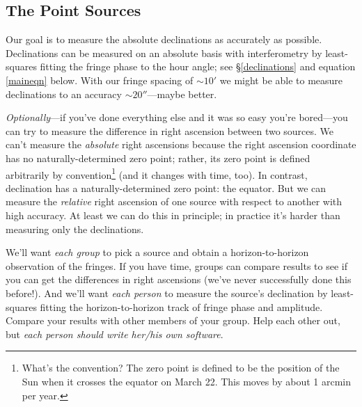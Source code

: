 \documentclass[11pt,preprint]{aastex}
\begin{document}
\subsection{The Point Sources}

	Our goal is to measure the absolute declinations as accurately
as possible.  Declinations can be measured on an absolute basis with
interferometry by least-squares fitting the fringe phase to the hour
angle; see \S\ref{declinations} and equation \ref{maineqn} below.  With our
fringe spacing of $\sim 10'$ we might be able to measure declinations to
an accuracy $\sim 20''$---maybe better.

{\it Optionally}---if you've done everything else and it was so easy
you're bored---you can try to measure the difference in right ascension
between two sources.  We can't measure the {\it absolute} right
ascensions because the right ascension coordinate has no
naturally-determined zero point; rather, its zero point is defined
arbitrarily by convention\footnote{What's the convention? The zero point
is defined to be the position of the Sun when it crosses the equator on
March 22. This moves by about 1 arcmin per year.} (and it changes with
time, too).  In contrast, declination has a naturally-determined zero
point: the equator.  But we can measure the {\it relative} right
ascension of one source with respect to another with high accuracy.  At
least we can do this in principle; in practice it's harder than
measuring only the declinations.

	We'll want {\it each group} to pick a source and obtain a
horizon-to-horizon observation of the fringes. If you have time, groups
can compare results to see if you can get the differences in right
ascensions (we've never successfully done this before!). And we'll want
{\it each person} to measure the source's declination by least-squares
fitting the horizon-to-horizon track of fringe phase and amplitude.
Compare your results with other members of your group.  Help each other
out, but {\it each person should write her/his own software}.
\end{document}

